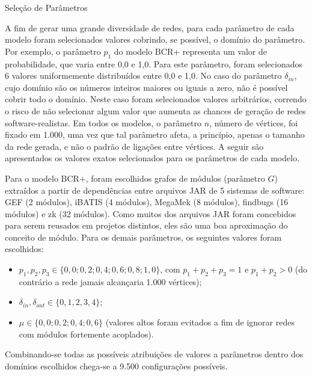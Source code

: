 \begin{section}{Seleção de Parâmetros} \label{sec:parametros}
	
	A fim de gerar uma grande diversidade de redes, para cada parâmetro de cada modelo foram selecionados valores cobrindo, se possível, o domínio do parâmetro. Por exemplo, o parâmetro $p_1$ do modelo BCR+ representa um valor de probabilidade, que varia entre 0,0 e 1,0. Para este parâmetro, foram selecionados 6 valores uniformemente distribuídos entre 0,0 e 1,0. No caso do parâmetro $\delta_{in}$, cujo domínio são os números inteiros maiores ou iguais a zero, não é possível cobrir todo o domínio. Neste caso foram selecionados valores arbitrários, correndo o risco de não selecionar algum valor que aumenta as chances de geração de redes software-realistas. Em todos os modelos, o parâmetro $n$, número de vértices, foi fixado em 1.000, uma vez que tal parâmetro afeta, a princípio, apenas o tamanho da rede gerada, e não o padrão de ligações entre vértices. A seguir são apresentados os valores exatos selecionados para os parâmetros de cada modelo.

Para o modelo BCR+, foram escolhidos grafos de módulos (parâmetro $G$) extraídos a partir de dependências entre arquivos JAR de 5 sistemas de software: GEF (2 módulos), iBATIS (4 módulos), MegaMek (8 módulos), findbugs (16 módulos) e zk (32 módulos). Como muitos dos arquivos JAR foram concebidos para serem reusados em projetos distintos, eles são uma boa aproximação do conceito de módulo. Para os demais parâmetros, os seguintes valores foram escolhidos:

\begin{itemize}
	\item $p_1, p_2, p_3 \in \{0,0; 0,2; 0,4; 0,6; 0,8; 1,0\}$, com $p_1 + p_2 + p_3 = 1$ e $p_1 + p_2 > 0$ (do contrário a rede jamais alcançaria 1.000 vértices);
	\item $\delta_{in}, \delta_{out} \in \{0, 1, 2, 3, 4\}$;
	\item $\mu \in \{0,0; 0,2; 0,4; 0,6\}$ (valores altos foram evitados a fim de ignorar redes com módulos fortemente acoplados).
\end{itemize}

Combinando-se todas as possíveis atribuições de valores a parâmetros dentro dos domínios escolhidos chega-se a 9.500 configurações possíveis.


\end{section}
